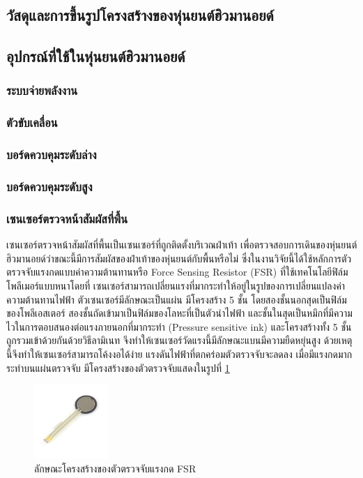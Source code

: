 \subsection{วัสดุและการขึ้นรูปโครงสร้างของหุ่นยนต์ฮิวมานอยด์}



\subsection{อุปกรณ์ที่ใช้ในหุ่นยนต์ฮิวมานอยด์}

\subsubsection{ระบบจ่ายพลังงาน}
\subsubsection{ตัวขับเคลื่อน}
\subsubsection{บอร์ดควบคุมระดับล่าง}
\subsubsection{บอร์ดควบคุมระดับสูง}

\subsubsection{เซนเซอร์ตรวจหน้าสัมผัสที่พื้น}
เซนเซอร์ตรวจหน้าสัมผัสที่พื้นเป็นเซนเซอร์ที่ถูกติดตั้งบริเวณฝ่าเท้า เพื่อตรวจสอบการเดินของหุ่นยนต์ฮิวมานอยด์ว่าขณะนี้มีการสัมผัสของฝ่าเท้าของหุ่นยนต์กับพื้นหรือไม่
ซึ่งในงานวิจัยนี้ได้ใช้หลักการตัวตรวจจับแรงกดแบบค่าความต้านทานหรือ Force Sensing Resistor (FSR) ที่ใช้เทคโนโลยีฟิล์มโพลีเมอร์แบบหนาโดยที่
เซนเซอร์สามารถเปลี่ยนแรงที่มากระทำให้อยู่ในรูปของการเปลี่ยนแปลงค่าความต้านทานไฟฟ้า ตัวเซนเซอร์มีลักษณะเป็นแผ่น มีโครงสร้าง 5 ชั้น
โดยสองชั้นนอกสุดเป็นฟิล์มของโพลีเอสเตอร์ สองชั้นถัดเข้ามาเป็นฟิล์มของโลหะที่เป็นตัวนำไฟฟ้า และชั้นในสุดเป็นหมึกที่มีความไวในการตอบสนองต่อแรงภายนอกที่มากระทำ
(Pressure sensitive ink) และโครงสร้างทั้ง 5 ชั้น ถูกรวมเข้าด้วยกันด้วยวิธีลามิเนท จึงทำให้เซนเซอร์วัดแรงนี้มีลักษณะแบนมีความยืดหยุ่นสูง
ด้วยเหตุนี้จึงทำให้เซนเซอร์สามารถโค้งงอได้ง่าย แรงดันไฟฟ้าที่ตกคร่อมตัวตรวจจับจะลดลง เมื่อมีแรงกดมากระทำบนแผ่นตรวจจับ มีโครงสร้างของตัวตรวจจับแสดงในรูปที่ \ref{fig:fsr_sensor} 

\begin{figure}[htbp]
    \centering
    \includegraphics[width=0.25\textwidth]{chapter2/images/FSRx.jpg}
    \caption{ลักษณะโครงสร้างของตัวตรวจจับแรงกด FSR}
    \label{fig:fsr_sensor}
\end{figure}

